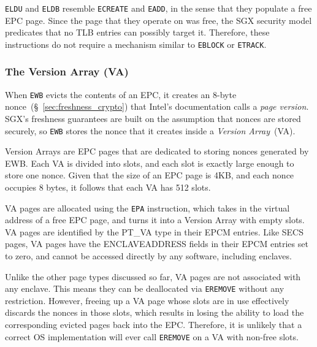\texttt{ELDU} and \texttt{ELDB} resemble \texttt{ECREATE} and \texttt{EADD},
in the sense that they populate a free EPC page. Since the page that they
operate on was free, the SGX security model predicates that no TLB entries can
possibly target it. Therefore, these instructions do not require a mechanism
similar to \texttt{EBLOCK} or \texttt{ETRACK}.


\subsubsection{The Version Array (VA)}
\label{sec:sgx_va}
\label{sec:sgx_epa}


When \texttt{EWB} evicts the contents of an EPC, it creates an 8-byte
nonce~(\S~\ref{sec:freshness_crypto}) that Intel's documentation calls a
\textit{page version}. SGX's freshness guarantees are built on the assumption
that nonces are stored securely, so \texttt{EWB} stores the nonce that it
creates inside a \textit{Version Array}~(VA).

Version Arrays are EPC pages that are dedicated to storing nonces generated by
EWB. Each VA is divided into slots, and each slot is exactly large enough to
store one nonce. Given that the size of an EPC page is 4KB, and each nonce
occupies 8 bytes, it follows that each VA has 512 slots.


VA pages are allocated using the \texttt{EPA} instruction, which takes in the
virtual address of a free EPC page, and turns it into a Version Array with
empty slots. VA pages are identified by the PT\_VA type in their EPCM entries.
Like SECS pages, VA pages have the ENCLAVEADDRESS fields in their EPCM entries
set to zero, and cannot be accessed directly by any software, including
enclaves.


Unlike the other page types discussed so far, VA pages are not associated with
any enclave. This means they can be deallocated via \texttt{EREMOVE} without
any restriction. However, freeing up a VA page whose slots are in use
effectively discards the nonces in those slots, which results in losing the
ability to load the corresponding evicted pages back into the EPC. Therefore,
it is unlikely that a correct OS implementation will ever call \texttt{EREMOVE}
on a VA with non-free slots.

